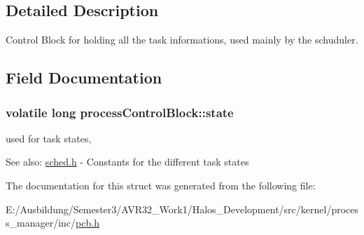 \subsection{Detailed Description}
Control Block for holding all the task informations, used mainly by the schuduler. 

\subsection{Field Documentation}
\hypertarget{structprocess_control_block_b4db55d4f01fe77a8afe8debb9c701fd}{
\subsubsection[{state}]{\setlength{\rightskip}{0pt plus 5cm}volatile long {\bf processControlBlock::state}}}
\label{structprocess_control_block_b4db55d4f01fe77a8afe8debb9c701fd}


used for task states, 

\begin{Desc}
\item[See also:]\hyperlink{sched_8h}{sched.h} - Constants for the different task states \end{Desc}


The documentation for this struct was generated from the following file:\begin{CompactItemize}
\item 
E:/Ausbildung/Semester3/AVR32\_\-Work1/Halos\_\-Development/src/kernel/process\_\-manager/inc/\hyperlink{pcb_8h}{pcb.h}\end{CompactItemize}
